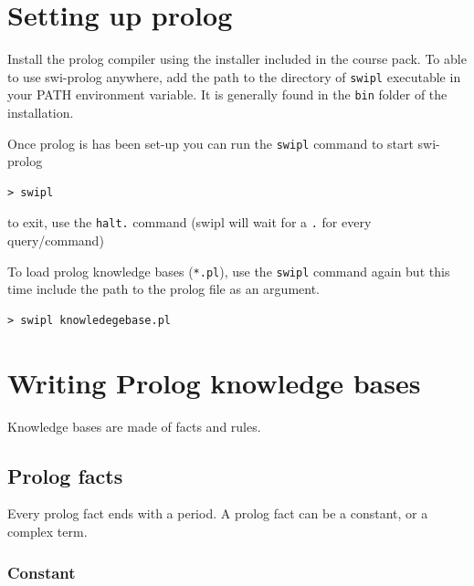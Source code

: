 \section{Setting up
prolog}\label{prolog-cheat-sheet.md__setting-up-prolog}

Install the prolog compiler using the installer included in the course
pack. To able to use swi-prolog anywhere, add the path to the directory
of \texttt{swipl} executable in your PATH environment variable. It is
generally found in the \texttt{bin} folder of the installation.

Once prolog is has been set-up you can run the \texttt{swipl} command to
start swi-prolog

\begin{verbatim}
> swipl
\end{verbatim}

to exit, use the \texttt{halt.} command (swipl will wait for a
\texttt{.} for every query/command)

\begin{Shaded}
\begin{Highlighting}[]
\end{Highlighting}
\end{Shaded}

To load prolog knowledge bases (\texttt{*.pl}), use the \texttt{swipl}
command again but this time include the path to the prolog file as an
argument.

\begin{verbatim}
> swipl knowledegebase.pl
\end{verbatim}

\section{Writing Prolog knowledge
bases}\label{prolog-cheat-sheet.md__writing-prolog-knowledge-bases}

Knowledge bases are made of facts and rules.

\subsection{Prolog facts}\label{prolog-cheat-sheet.md__prolog-facts}

Every prolog fact ends with a period. A prolog fact can be a constant,
or a complex term.

\subsubsection{Constant}\label{prolog-cheat-sheet.md__constant}

